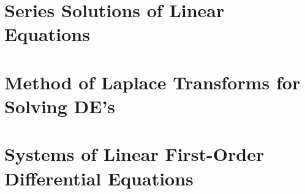 \documentclass[title={MATH 252 - Introduction to Differential Equations Notes}]{math252notes}
\begin{document}
\chapter{Series Solutions of Linear Equations}\label{ch:series-solutions-of-linear-equations}

\chapter[The Laplace Transform]{Method of Laplace Transforms for Solving DE's}\label{ch:method-of-laplace-transforms-for-solving-de's}

\chapter{Systems of Linear First-Order Differential Equations}\label{ch:systems-of-linear-first-order-differential-equations}

\appendix
\setcounter{chapter}{1}
\chapter{}\label{appendix:b}
\end{document}
